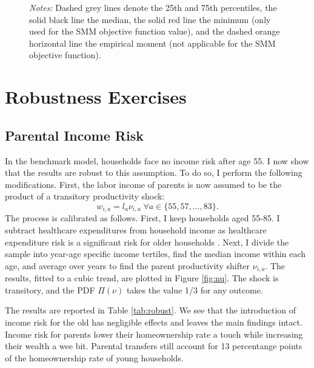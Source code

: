 \documentclass[12pt]{article}
\begin{document}
\begin{figure}
\begin{subfigure}{\textwidth}
	\end{subfigure}
	{\begin{footnotesize} \textit{Notes:} Dashed grey lines denote the 25th and 75th percentiles, the solid black line the median, the solid red line the minimum (only used for the SMM objective function value), and the dashed orange horizontal line the empirical moment (not applicable for the SMM objective function).\end{footnotesize}}
\end{figure}


\section{Robustness Exercises}
\subsection{Parental Income Risk}\label{sec:robust_incomerisk}
In the benchmark model, households face no income risk after age 55. I now show that the results are robust to this assumption. To do so, I perform the following modifications. First, the labor income of parents is now assumed to be the product of a transitory productivity shock:
\begin{equation*}
w_{i,a} = l_a \nu_{i,a} \; \forall a\in\{55,57,\dots,83\}. \label{eq:wp2}
\end{equation*}
The process is calibrated as follows. First, I keep households aged 55-85. I subtract healthcare expenditures from household income as healthcare expenditure risk is a significant risk for older households \citep{denardi2024}. Next, I divide the sample into year-age specific income tertiles, find the median income within each age, and average over years to find the parent productivity shifter $\nu_{i,a}$. The results, fitted to a cubic trend, are plotted in Figure \ref{fig:nu}. The shock is transitory, and the PDF $\Pi(\nu)$ takes the value 1/3 for any outcome.

The results are reported in Table \ref{tab:robust}. We see that the introduction of income risk for the old has negligible effects and leaves the main findings intact. Income risk for parents lower their homeownership rate a touch while increasing their wealth a wee bit. Parental transfers still account for 13 percentange points of the homeownership rate of young households.
\end{document}
